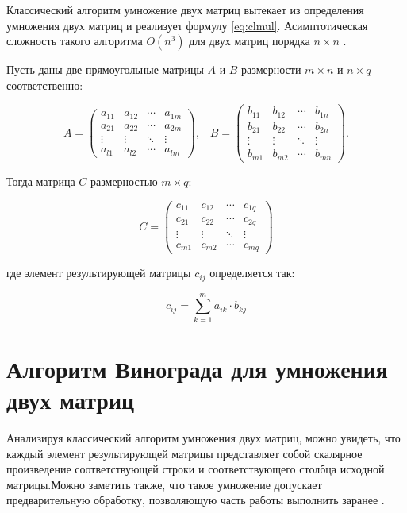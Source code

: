 Классический алгоритм умножение двух матриц вытекает из определения умножения двух матриц и реализует формулу \ref{eq:clmul}.  Асимптотическая сложность такого алгоритма $O(n^3)$ для двух матриц порядка $n \times n$ \cite{Classic}. 

Пусть даны две прямоугольные матрицы $A$ и $B$ размерности $m \times n$ и $n \times q$ соответственно:

\begin{equation*}
A = 
\begin{pmatrix} 
	a_{11} & a_{12} & \cdots & a_{1m} \\
	a_{21} & a_{22} & \cdots & a_{2m} \\ 
	\vdots & \vdots & \ddots & \vdots \\ 
	a_{l1} & a_{l2} & \cdots & a_{lm}
\end{pmatrix},\;\;\;
B =   
\begin{pmatrix} 
	b_{11} & b_{12} & \cdots & b_{1n} \\
	b_{21} & b_{22} & \cdots & b_{2n} \\ 
	\vdots & \vdots & \ddots & \vdots \\ 
	b_{m1} & b_{m2} & \cdots & b_{mn}
\end{pmatrix}.
\end{equation*}

Тогда матрица $C$ размерностью $m \times q$:

\begin{equation*}
C = 
\begin{pmatrix} 
	c_{11} & c_{12} & \cdots & c_{1q} \\
	c_{21} & c_{22} & \cdots & c_{2q} \\ 
	\vdots & \vdots & \ddots & \vdots \\ 
	c_{m1} & c_{m2} & \cdots & c_{mq}
\end{pmatrix} 
\end{equation*}

где элемент результирующей матрицы $c_{ij}$ определяется так:

\begin{equation}
	\label{eq:clmul}
	c_{ij} = \sum_{k=1}^m a_{ik} \cdot b_{kj}
\end{equation}

\section{Алгоритм Винограда для умножения двух матриц}

Анализируя классический алгоритм умножения двух матриц, можно увидеть, что каждый элемент результирующей матрицы представляет собой скалярное произведение соответствующей строки и соответствующего столбца исходной матрицы.Можно заметить также, что такое умножение допускает предварительную обработку, позволяющую часть работы выполнить заранее \cite{Vin}. 

